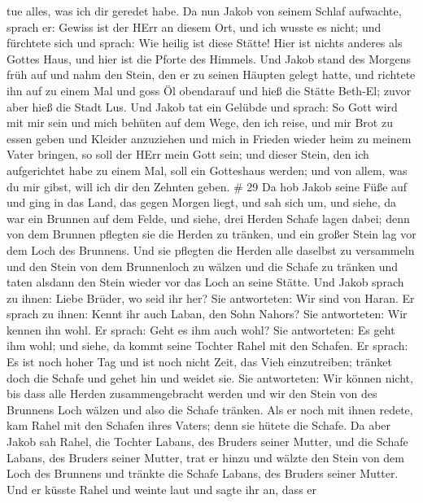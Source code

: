 tue alles, was ich dir geredet habe.  Da nun Jakob von
seinem Schlaf aufwachte, sprach er: Gewiss ist der HErr an diesem Ort,
und ich wusste es nicht;  und fürchtete sich und sprach:
Wie heilig ist diese Stätte! Hier ist nichts anderes als Gottes Haus,
und hier ist die Pforte des Himmels.  Und Jakob stand des
Morgens früh auf und nahm den Stein, den er zu seinen Häupten gelegt
hatte, und richtete ihn auf zu einem Mal und goss Öl obendarauf
 und hieß die Stätte Beth-El; zuvor aber hieß die Stadt
Lus.  Und Jakob tat ein Gelübde und sprach: So Gott wird
mit mir sein und mich behüten auf dem Wege, den ich reise, und mir Brot
zu essen geben und Kleider anzuziehen  und mich in Frieden
wieder heim zu meinem Vater bringen, so soll der HErr mein Gott sein;
 und dieser Stein, den ich aufgerichtet habe zu einem Mal,
soll ein Gotteshaus werden; und von allem, was du mir gibst, will ich
dir den Zehnten geben. \# 29  Da hob Jakob seine Füße auf
und ging in das Land, das gegen Morgen liegt,  und sah sich
um, und siehe, da war ein Brunnen auf dem Felde, und siehe, drei Herden
Schafe lagen dabei; denn von dem Brunnen pflegten sie die Herden zu
tränken, und ein großer Stein lag vor dem Loch des Brunnens.
 Und sie pflegten die Herden alle daselbst zu versammeln und
den Stein von dem Brunnenloch zu wälzen und die Schafe zu tränken und
taten alsdann den Stein wieder vor das Loch an seine Stätte.
 Und Jakob sprach zu ihnen: Liebe Brüder, wo seid ihr her?
Sie antworteten: Wir sind von Haran.  Er sprach zu ihnen:
Kennt ihr auch Laban, den Sohn Nahors? Sie antworteten: Wir kennen ihn
wohl.  Er sprach: Geht es ihm auch wohl? Sie antworteten: Es
geht ihm wohl; und siehe, da kommt seine Tochter Rahel mit den Schafen.
 Er sprach: Es ist noch hoher Tag und ist noch nicht Zeit,
das Vieh einzutreiben; tränket doch die Schafe und gehet hin und weidet
sie.  Sie antworteten: Wir können nicht, bis dass alle
Herden zusammengebracht werden und wir den Stein von des Brunnens Loch
wälzen und also die Schafe tränken.  Als er noch mit ihnen
redete, kam Rahel mit den Schafen ihres Vaters; denn sie hütete die
Schafe.  Da aber Jakob sah Rahel, die Tochter Labans, des
Bruders seiner Mutter, und die Schafe Labans, des Bruders seiner Mutter,
trat er hinzu und wälzte den Stein von dem Loch des Brunnens und tränkte
die Schafe Labans, des Bruders seiner Mutter.  Und er
küsste Rahel und weinte laut  und sagte ihr an, dass er
